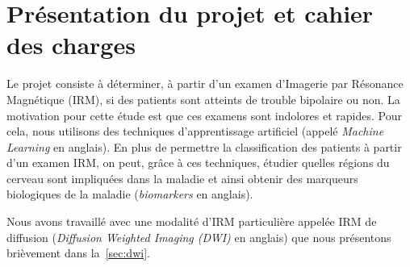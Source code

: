 \chapter{Présentation du projet et cahier des charges}

Le projet consiste à déterminer, à partir d'un examen d'Imagerie par Résonance Magnétique (IRM), si des patients sont atteints de trouble bipolaire ou non.
La motivation pour cette étude est que ces examens sont indolores et rapides.
Pour cela, nous utilisons des techniques d'apprentissage artificiel (appelé \textit{Machine Learning} en anglais).
En plus de permettre la classification des patients à partir d'un examen IRM, on peut, grâce à ces techniques, étudier quelles régions du cerveau sont impliquées dans la maladie et ainsi
obtenir des marqueurs biologiques de la maladie (\textit{biomarkers} en anglais).

Nous avons travaillé avec une modalité d'IRM particulière appelée IRM de diffusion (\textit{Diffusion Weighted Imaging (DWI)} en anglais)
que nous présentons brièvement dans la~\autoref{sec:dwi}.





